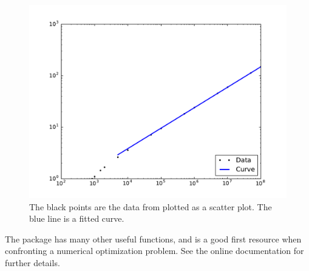 \begin{figure}
\includegraphics[width=\textwidth]{ConvectionFit.pdf}
\caption{The black points are the data from  plotted as a scatter plot. The blue line is a fitted curve.}
\label{opt:ConvectionFit}
\end{figure}

The  package has many other useful functions, and is a good first resource when confronting a numerical optimization problem. See the online documentation for further details.


